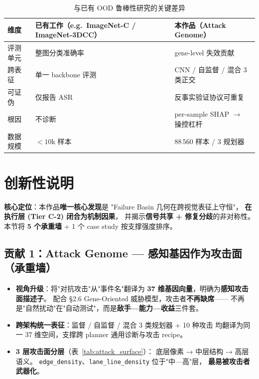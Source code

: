 \documentclass[a4paper,12pt,fontset=fandol]{ctexart}
\newcommand{\gene}[1]{\texttt{#1}}
\begin{document}
{\begin{table}[H]
\centering
\small
\caption{与已有 OOD 鲁棒性研究的关键差异}
\begin{tabularx}{\linewidth}{lXX}
\toprule
\textbf{维度} & \textbf{已有工作（e.g.\ ImageNet-C / ImageNet-3DCC）} & \textbf{本作品（Attack Genome）} \\
\midrule
评测单元 & 整图分类准确率 & gene-level 失效贡献 \\
跨表征 & 单一 backbone 评测 & CNN / 自监督 / 混合 3 类正交 \\
可证伪 & 仅报告 ASR & 反事实验证协议可重复 \\
根因 & 不诊断 & per-sample SHAP $\to$ 操控杠杆 \\
数据规模 & $< 10$k 样本 & 88\,560 样本 / 3 规划器 \\
\bottomrule
\end{tabularx}
\end{table}

\newpage
\section{创新性说明}

\noindent\textbf{核心定位}：本作品\textbf{唯一核心发现}是
"Failure Basin 几何在跨视觉表征上守恒"，
\textbf{在执行层 (Tier C-2) 闭合为机制因果}，
并揭示\textbf{信号共享 + 修复分歧}的非对称性。
本节将 \textbf{5 个承重墙} + 1 个 case study 按支撑强度排序。

\subsection{贡献 1：Attack Genome — 感知基因作为攻击面（\textbf{承重墙}）}

\begin{itemize}
\item \textbf{视角升级}：将"对抗攻击"从"事件名"翻译为
      \textbf{37 维基因向量}，明确为\textbf{感知攻击面描述子}。
      配合 §2.6 Gene-Oriented 威胁模型，攻击者\textbf{不再缺席}——
      不再是"自然扰动"在"自动测试"，而是\textbf{敌手—能力—收益}三件套。
\item \textbf{跨架构统一表征}：监督 / 自监督 / 混合 3 类规划器 + 10 种攻击
      均翻译为同一 37 维空间，支撑跨 planner 通用诊断与攻击 recipe。
\item \textbf{3 层攻击面分层}（表~\ref{tab:attack_surface}）：
      底层像素 → 中层结构 → 高层语义。
      \gene{edge\_density}、\gene{lane\_line\_density} 位于"中—高"层，
      \textbf{最易被攻击者武器化}。
\end{itemize}

}
\end{document}
